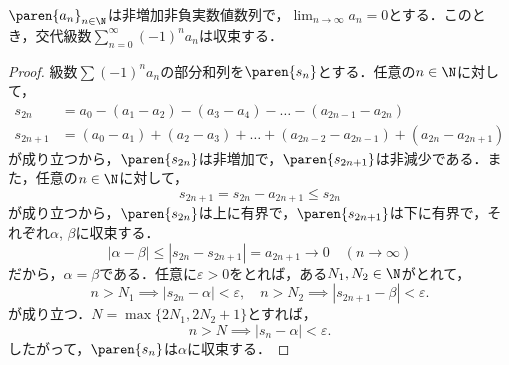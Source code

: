 \documentclass[a4paper,10pt]{ltjsarticle}
\begin{document}
\begin{MyTheorem}
  \(\paren{a_n}_{n\in\N}\)は非増加非負実数値数列で，\(\lim_{n \to \infty} a_n = 0\)とする．このとき，交代級数\(\sum_{n=0}^\infty (-1)^{n} a_n\)は収束する．
\end{MyTheorem}
\begin{proof}
  級数\(\sum (-1)^n a_n\)の部分和列を\(\paren{s_n}\)とする．任意の\(n \in \N\)に対して，
  \begin{align*}
    s_{2n}   & = a_0 - (a_1 - a_2) - (a_3 - a_4) - \dots - (a_{2n-1} - a_{2n})                   \\
    s_{2n+1} & = (a_0 - a_1) + (a_2 - a_3) + \dots + (a_{2n-2} - a_{2n-1}) + (a_{2n} - a_{2n+1})
  \end{align*}
  が成り立つから，\(\paren{s_{2n}}\)は非増加で，\(\paren{s_{2n+1}}\)は非減少である．また，任意の\(n \in \N\)に対して，
  \[ s_{2n+1} = s_{2n} - a_{2n + 1} \le s_{2n} \]
  が成り立つから，\(\paren{s_{2n}}\)は上に有界で，\(\paren{s_{2n+1}}\)は下に有界で，それぞれ\(\alpha\), \(\beta\)に収束する．
  \[ |\alpha - \beta| \le |s_{2n} - s_{2n+1}| = a_{2n + 1} \to 0 \quad (n \to \infty) \]
  だから，\(\alpha = \beta\)である．任意に\(\varepsilon > 0\)をとれば，ある\(N_1, N_2 \in \N\)がとれて，
  \[ n > N_1 \implies |s_{2n} - \alpha| < \varepsilon, \quad n > N_2 \implies |s_{2n+1} - \beta| < \varepsilon. \]
  が成り立つ．\(N = \max\{2N_1, 2N_2 + 1\}\)とすれば，
  \[ n > N \implies |s_n - \alpha| < \varepsilon. \]
  したがって，\(\paren{s_n}\)は\(\alpha\)に収束する．
\end{proof}
\end{document}
